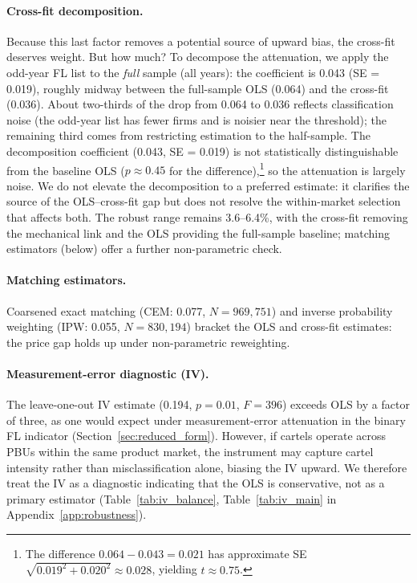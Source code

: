 \paragraph{Cross-fit decomposition.}
Because this last factor removes a potential source of upward bias, the
cross-fit deserves weight. But how much? To decompose the attenuation,
we apply the odd-year FL list to the \emph{full} sample (all years):
the coefficient is 0.043 (SE = 0.019), roughly midway between the
full-sample OLS (0.064) and the cross-fit (0.036). About two-thirds of
the drop from 0.064 to 0.036 reflects classification noise (the
odd-year list has fewer firms and is noisier near the threshold); the
remaining third comes from restricting estimation to the half-sample.
The decomposition coefficient (0.043, SE = 0.019) is not
statistically distinguishable from the baseline OLS
($p \approx 0.45$ for the difference),\footnote{The difference
$0.064 - 0.043 = 0.021$ has approximate SE
$\sqrt{0.019^2 + 0.020^2} \approx 0.028$, yielding $t \approx 0.75$.}
so the attenuation is largely noise. We do not elevate the
decomposition to a preferred estimate: it clarifies the source of the
OLS--cross-fit gap but does not resolve the within-market selection
that affects both. The robust range remains 3.6--6.4\%, with the
cross-fit removing the mechanical link and the OLS providing the
full-sample baseline; matching estimators (below) offer a further
non-parametric check.

\paragraph{Matching estimators.}
Coarsened exact matching (CEM: 0.077, $N = 969{,}751$) and inverse
probability weighting (IPW: 0.055, $N = 830{,}194$) bracket the OLS
and cross-fit estimates: the price gap holds up under non-parametric
reweighting.

\paragraph{Measurement-error diagnostic (IV).}
The leave-one-out IV estimate (0.194, $p = 0.01$, $F = 396$) exceeds
OLS by a factor of three, as one would expect under measurement-error
attenuation in the binary FL indicator
(Section~\ref{sec:reduced_form}). However, if cartels operate across
PBUs within the same product market, the instrument may capture cartel
intensity rather than misclassification alone, biasing the IV upward.
We therefore treat the IV as a diagnostic indicating that the OLS is
conservative, not as a primary estimator
(Table~\ref{tab:iv_balance}, Table~\ref{tab:iv_main} in
Appendix~\ref{app:robustness}).

